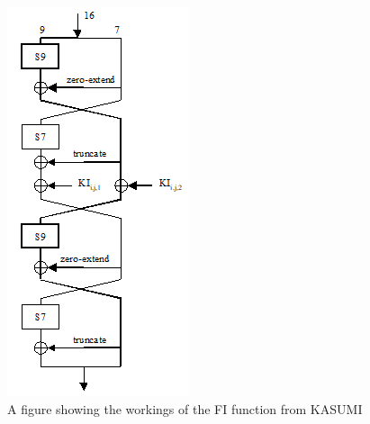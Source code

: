 \documentclass[10pt,journal,compsoc]{IEEEtran}
\begin{document}
\begin{appendices}
\begin{figure}[H]
    \centering
    \includegraphics[width=\linewidth, height=\textheight, keepaspectratio]{Figures/FI_diag.png}
    \caption{A figure showing the workings of the FI function from KASUMI}
    \label{fig:kasumi-FI}
\end{figure}


\end{appendices}
\end{document}

